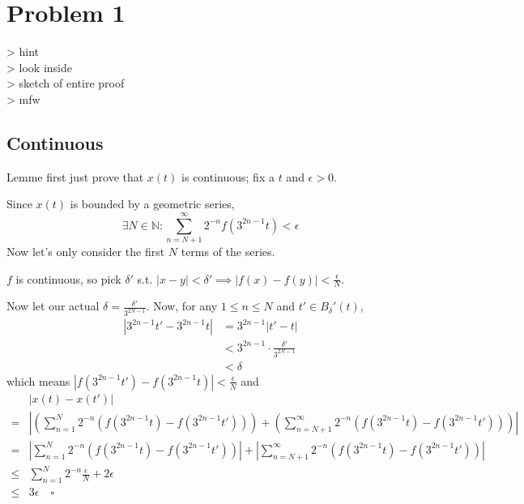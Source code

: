\documentclass[12pt]{article}
\newcommand{\N}{\mathbb{N}}
\begin{document}
\section{Problem 1}

> hint \\
> look inside \\
> sketch of entire proof \\
> mfw

\subsection{Continuous}

Lemme first just prove that $x(t)$ is continuous; fix a $t$ and $\epsilon > 0$.

Since $x(t)$ is bounded by a geometric series,
\[\exists N \in \N: \sum_{n=N+1}^{\infty} 2^{-n}f\left(3^{2n-1}t\right) < \epsilon\]
Now let's only consider the first $N$ terms of the series.

$f$ is continuous, so pick $\delta'$ s.t. $|x-y| < \delta' \implies |f(x)-f(y)| < \frac{\epsilon}{N}$.

Now let our actual $\delta=\frac{\delta'}{3^{2N-1}}$.
Now, for any $1 \le n \le N$ and $t' \in B_\delta'(t)$,
\begin{align*}
  \left|3^{2n-1}t' - 3^{2n-1}t\right|
   & = 3^{2n-1}\left|t'-t\right|               \\
   & < 3^{2n-1} \cdot \frac{\delta'}{3^{2N-1}} \\
   & < \delta
\end{align*}
which means $\left|f\left(3^{2n-1}t'\right)-f\left(3^{2n-1}t\right)\right| < \frac{\epsilon}{N}$ and
\begin{align*}
        & |x(t)-x(t')|                                                                                           \\
  ={}   & \left|\left(\sum_{n=1}^{N} 2^{-n}\left(f\left(3^{2n-1}t\right)-f\left(3^{2n-1}t'\right)\right)\right)
  +\left(\sum_{n=N+1}^{\infty} 2^{-n}\left(f\left(3^{2n-1}t\right)-f\left(3^{2n-1}t'\right)\right)\right)\right| \\
  ={}   & \left|\sum_{n=1}^{N} 2^{-n}\left(f\left(3^{2n-1}t\right)-f\left(3^{2n-1}t'\right)\right)\right|
  +\left|\sum_{n=N+1}^{\infty} 2^{-n}\left(f\left(3^{2n-1}t\right)-f\left(3^{2n-1}t'\right)\right)\right|        \\
  \le{} & \sum_{n=1}^{N} 2^{-n}\frac{\epsilon}{N} + 2\epsilon                                                    \\
  \le{} & 3\epsilon\quad\square
\end{align*}
\end{document}
